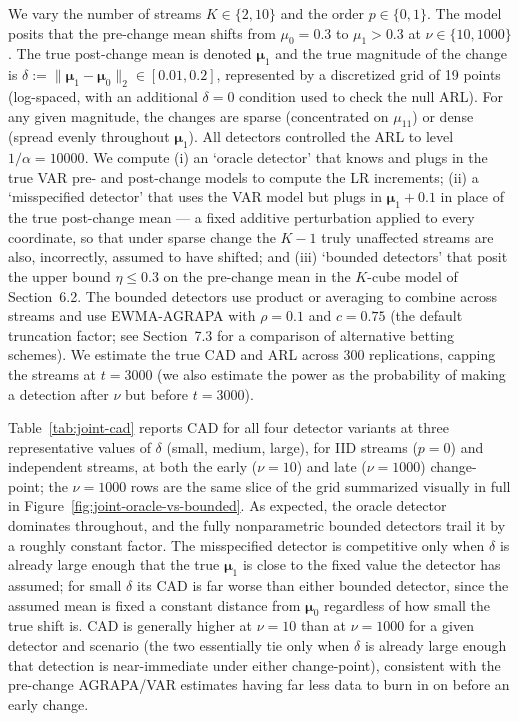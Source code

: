 We vary the number of streams $K \in \{2, 10\}$ and the order $p \in \{0, 1\}$. The model posits
that the pre-change mean shifts from $\mu_0 = 0.3$ to $\mu_1 > 0.3$ at $\nu \in \{10, 1000\}$. The
true post-change mean is denoted $\bm{\mu}_1$ and the true magnitude of the change is
$\delta := \lVert \bm{\mu}_1 - \bm{\mu}_0 \rVert_2 \in [0.01, 0.2]$, represented by a discretized
grid of 19 points (log-spaced, with an additional $\delta = 0$ condition used to check the null
ARL). For any given magnitude, the changes are sparse (concentrated on $\mu_{11}$) or dense
(spread evenly throughout $\bm{\mu}_1$). All detectors controlled the ARL to level
$1/\alpha = 10000$. We compute (i) an `oracle detector' that knows and plugs in the true VAR
pre- and post-change models to compute the LR increments; (ii) a `misspecified detector' that
uses the VAR model but plugs in $\bm{\mu}_1 + 0.1$ in place of the true post-change mean --- a
fixed additive perturbation applied to every coordinate, so that under sparse change the $K-1$
truly unaffected streams are also, incorrectly, assumed to have shifted; and (iii) `bounded
detectors' that posit the upper bound $\eta \le 0.3$ on the pre-change mean in the $K$-cube model
of Section~6.2. The bounded detectors use product or averaging to combine across streams and use
EWMA-AGRAPA with $\rho = 0.1$ and $c = 0.75$ (the default truncation factor; see Section~7.3 for a
comparison of alternative betting schemes). We estimate the true CAD and ARL across 300
replications, capping the streams at $t = 3000$ (we also estimate the power as the probability of
making a detection after $\nu$ but before $t = 3000$).

Table~\ref{tab:joint-cad} reports CAD for all four detector variants at three representative
values of $\delta$ (small, medium, large), for IID streams ($p=0$) and independent streams, at
both the early ($\nu = 10$) and late ($\nu = 1000$) change-point; the $\nu = 1000$ rows are the
same slice of the grid summarized visually in full in Figure~\ref{fig:joint-oracle-vs-bounded}. As
expected, the oracle detector dominates throughout, and the fully nonparametric bounded detectors
trail it by a roughly constant factor. The misspecified detector is competitive only when $\delta$
is already large enough that the true $\bm{\mu}_1$ is close to the fixed value the detector has
assumed; for small $\delta$ its CAD is far worse than either bounded detector, since the assumed
mean is fixed a constant distance from $\bm{\mu}_0$ regardless of how small the true shift is. CAD
is generally higher at $\nu = 10$ than at $\nu = 1000$ for a given detector and scenario (the two
essentially tie only when $\delta$ is already large enough that detection is near-immediate under
either change-point), consistent with the pre-change AGRAPA/VAR estimates having far less data to
burn in on before an early change.

